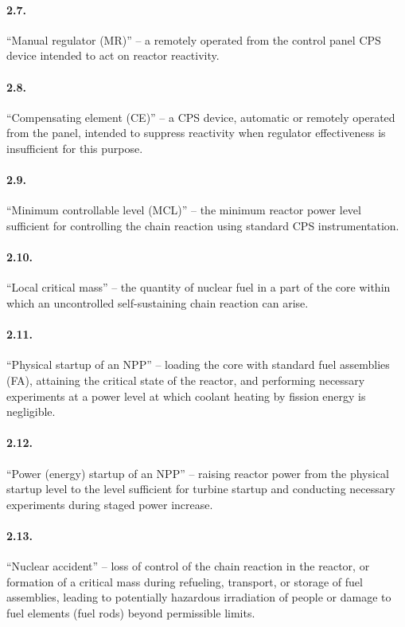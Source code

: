 \documentclass[openright]{bookest}
\begin{document}
\paragraph{2.7.} ``Manual regulator (MR)'' -- a remotely operated from the control panel CPS device intended to act on reactor reactivity.

\paragraph{2.8.} ``Compensating element (CE)'' -- a CPS device, automatic or remotely operated from the panel, intended to suppress reactivity when regulator effectiveness is insufficient for this purpose.

\paragraph{2.9.} ``Minimum controllable level (MCL)'' -- the minimum reactor power level sufficient for controlling the chain reaction using standard CPS instrumentation.

\paragraph{2.10.} ``Local critical mass'' -- the quantity of nuclear fuel in a part of the core within which an uncontrolled self-sustaining chain reaction can arise.

\paragraph{2.11.} ``Physical startup of an NPP'' -- loading the core with standard fuel assemblies (FA), attaining the critical state of the reactor, and performing necessary experiments at a power level at which coolant heating by fission energy is negligible.

\paragraph{2.12.} ``Power (energy) startup of an NPP'' -- raising reactor power from the physical startup level to the level sufficient for turbine startup and conducting necessary experiments during staged power increase.

\paragraph{2.13.} ``Nuclear accident'' -- loss of control of the chain reaction in the reactor, or formation of a critical mass during refueling, transport, or storage of fuel assemblies, leading to potentially hazardous irradiation of people or damage to fuel elements (fuel rods) beyond permissible limits.
\end{document}
